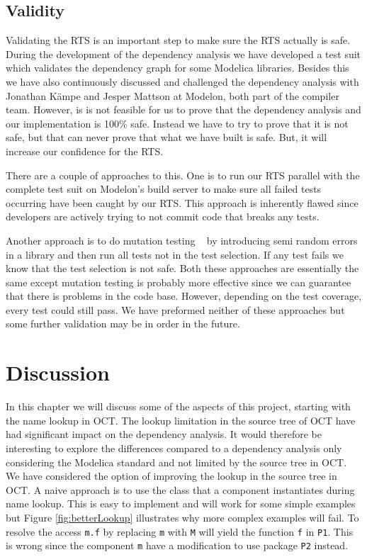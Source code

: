 \documentclass{cslthse-msc}
\begin{document}
\section{Validity}
Validating the RTS is an important step to make sure the RTS actually is safe. During the development of the dependency analysis we have developed a test suit which validates the dependency graph for some Modelica libraries. Besides this we have also continuously discussed and challenged the dependency analysis with Jonathan Kämpe and Jesper Mattson at Modelon, both part of the compiler team. However, is is not feasible for us to prove that the dependency analysis and our implementation is 100\% safe. Instead we have to try to prove that it is not safe, but that can never prove that what we have built is safe. But, it will increase our confidence for the RTS. 

There are a couple of approaches to this. One is to run our RTS parallel with the complete test suit on Modelon's build server to make sure all failed tests occurring have been caught by our RTS. This approach is inherently flawed since developers are actively trying to not commit code that breaks any tests.

Another approach is to do mutation testing ~\cite{DBLP:journals/tse/JiaH11} by introducing semi random errors in a library and then run all tests not in the test selection. If any test fails we know that the test selection is not safe. Both these approaches are essentially the same except mutation testing is probably more effective since we can guarantee that there is problems in the code base. However, depending on the test coverage, every test could still pass. We have preformed neither of these approaches but some further validation may be in order in the future.
\chapter[Discussion]{Discussion}

In this chapter we will discuss some of the aspects of this project, starting with the name lookup in OCT. The lookup limitation in the source tree of OCT have had significant impact on the dependency analysis. It would therefore be interesting to explore the differences compared to a dependency analysis only considering the Modelica standard and not limited by the source tree in OCT. We have considered the option of improving the lookup in the source tree in OCT. A naive approach is to use the class that a component instantiates during name lookup. This is easy to implement and will work for some simple examples but Figure \ref{fig:betterLookup} illustrates why more complex examples will fail. To resolve the access \texttt{m.f} by replacing \texttt{m} with \texttt{M} will yield the function \texttt{f} in \texttt{P1}. This is wrong since the component \texttt{m} have a modification to use package \texttt{P2} instead.
\end{document}
